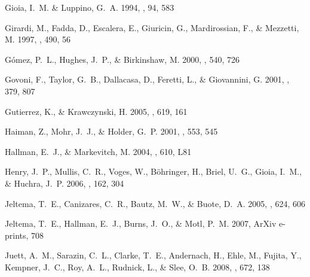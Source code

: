 \documentclass[12pt,preprint]{aastex}
\begin{document}
\begin{thebibliography}{}
{Gioia}, I.~M. \& {Luppino}, G.~A. 1994, \apjs, 94, 583

{Girardi}, M., {Fadda}, D., {Escalera}, E., {Giuricin}, G., {Mardirossian}, F.,
  \& {Mezzetti}, M. 1997, \apj, 490, 56

{G{\'o}mez}, P.~L., {Hughes}, J.~P., \& {Birkinshaw}, M. 2000, \apj, 540, 726

{Govoni}, F., {Taylor}, G.~B., {Dallacasa}, D., {Feretti}, L., \& {Giovannini},
  G. 2001, \aap, 379, 807

{Gutierrez}, K., \& {Krawczynski}, H. 2005, \apj, 619, 161

{Haiman}, Z., {Mohr}, J.~J., \& {Holder}, G.~P. 2001, \apj, 553, 545

{Hallman}, E.~J., \& {Markevitch}, M. 2004, \apjl, 610, L81

{Henry}, J.~P., {Mullis}, C.~R., {Voges}, W., {B{\"o}hringer}, H., {Briel},
  U.~G., {Gioia}, I.~M., \& {Huchra}, J.~P. 2006, \apjs, 162, 304

{Jeltema}, T.~E., {Canizares}, C.~R., {Bautz}, M.~W., \& {Buote}, D.~A. 2005,
  \apj, 624, 606

{Jeltema}, T.~E., {Hallman}, E.~J., {Burns}, J.~O., \& {Motl}, P.~M. 2007,
  ArXiv e-prints, 708

{Juett}, A.~M., {Sarazin}, C.~L., {Clarke}, T.~E., {Andernach}, H., {Ehle}, M.,
  {Fujita}, Y., {Kempner}, J.~C., {Roy}, A.~L., {Rudnick}, L., \& {Slee}, O.~B.
  2008, \apj, 672, 138


\end{thebibliography}
\end{document}
